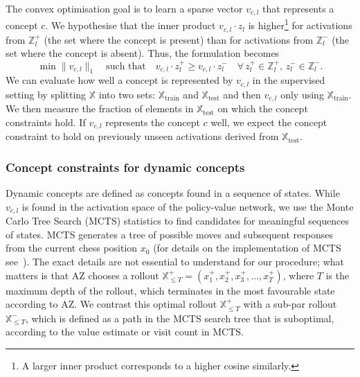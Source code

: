 \documentclass{article}
\def\Xset{\mathbb{X}}
\def\Zset{\mathbb{Z}}
\def\vcld{v_{c,l}\cdot}
\def\vcl{v_{c,l}}
\def\xp{\Xset^+_{\leq T}}
\def\xm{\Xset^-_{\leq T}}
\begin{document}
The convex optimisation goal is to learn a sparse vector $\vcl$ that represents a concept $c$. We hypothesise that the inner product $\vcld z_l$ is higher\footnote{A larger inner product corresponds to a higher cosine similarly.} for activations from $\Zset^+_l$ (the set where the concept is present) than for activations from $\Zset^-_l$ (the set where the concept is absent).
Thus, the formulation becomes
\begin{equation}\label{eq:convex_opt_basic}
    \min \| \vcl \|_1 \quad
    \textrm{such that}
    \quad \vcld z^+_l \geq \vcld z^-_l \quad \forall\,z_l^+ \in \Zset^+_l,\, z^-_l\in \Zset^-_l.
\end{equation}
We can evaluate how well a concept is represented by $\vcl$ in the supervised setting by splitting $\Xset$ into two sets:  $\Xset_{\mathrm{train}}$ and  $\Xset_{\mathrm{test}}$ and
then $\vcl$ only using  $\Xset_{\mathrm{train}}$.
We then measure the fraction of elements in $\Xset_{\mathrm{test}}$ on which the concept constraints hold.
If $\vcl$ represents the concept $c$ well, we expect the concept constraint to hold on previously unseen activations derived from $\Xset_{\mathrm{test}}$.

\subsubsection{Concept constraints for dynamic concepts} \label{sec:cp_dynamic_concept}
Dynamic concepts are defined as concepts found in a sequence of states. While $\vcl$ is found in the activation space of the policy-value network, we use the Monte Carlo Tree Search (MCTS) statistics to find candidates for meaningful sequences of states. MCTS generates a tree of possible moves and subsequent responses from the current chess position $x_0$
(for details on the implementation of MCTS see~\cite{schrittwieser2019mastering}). The exact details are not essential to understand for our procedure; what matters is that AZ chooses a rollout $\xp = (x^+_1, x^+_2, x^+_3, \ldots, x^+_T)$, where $T$ is the maximum depth of the rollout, which terminates in the most favourable state according to AZ. We contrast this optimal rollout $\xp$ with a sub-par rollout $\xm$, which is defined as a path in the MCTS search tree that is suboptimal, according to the value estimate or visit count in MCTS.  
\end{document}
